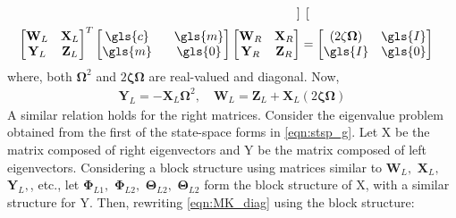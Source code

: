 \begin{align}
\begin{bmatrix}
	\end{bmatrix}\\	
	\begin{bmatrix}
		\mathbf{W}_L & \mathbf{X}_{L}\\
		\mathbf{Y}_L & \mathbf{Z}_L
	\end{bmatrix}^T
	\begin{bmatrix}
		\gls{c} & \phantom{-}\gls{m}\\
		\gls{m} & \phantom{-}\gls{0}
	\end{bmatrix}
	\begin{bmatrix}
		\mathbf{W}_R & \mathbf{X}_R\\
		\mathbf{Y}_R & \mathbf{Z}_R
	\end{bmatrix} &= 
	\begin{bmatrix}
		(2\mathbf{\zeta\Omega}) & \gls{I}\\
		\gls{I} & \gls{0}
	\end{bmatrix}	
\end{align}
where, both $\mathbf{\Omega}^2$ and $2\mathbf{\zeta\Omega}$ are real-valued
and diagonal. Now,
\begin{align}
\mathbf{Y}_{L} = -\mathbf{X}_{L}\mathbf{\Omega}^2, \quad
\mathbf{W}_L = \mathbf{Z}_L + \mathbf{X}_{L}(2\mathbf{\zeta\Omega})
\end{align}
A similar relation holds for the right matrices. Consider the eigenvalue 
problem obtained from the first of the state-space forms in \eqref{eqn:stsp_g}. 
Let \gls{X} be the matrix composed of right eigenvectors and \gls{Y}
be the matrix composed of left eigenvectors. Considering a block structure
using matrices similar to $\mathbf{W}_L,$ $\mathbf{X}_L,$ $\mathbf{Y}_L,$, etc.,
let $\mathbf{\Phi}_{L1},$ $\mathbf{\Phi}_{L2},$ $\mathbf{\Theta}_{L2},
$ $\mathbf{\Theta}_{L2}$ form the block structure of \gls{X}, with a similar
structure for \gls{Y}. Then, rewriting \eqref{eqn:MK_diag} using the block
structure:
